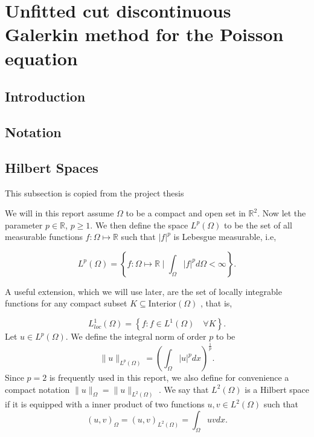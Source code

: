 
\newpage
\section{Unfitted cut discontinuous Galerkin method for the Poisson equation}%
\label{sec:elliptic}

\subsection{Introduction}%
\label{sub:introduction}


\subsection{Notation}%
\label{sub:notation}

\subsection{Hilbert Spaces}%

\label{ssub:hilbert_spaces}
\begin{tcolorbox}
    This subsection is copied from the project thesis
\end{tcolorbox}

We will in this report assume $\Omega $ to be a compact and open set in $\mathbb{R} ^{2}$. Now let the parameter $p \in \mathbb{R} $, $p\ge 1$. We then define the space $L^{p}\left( \Omega  \right) $ to be the set of all measurable functions $f: \Omega  \mapsto \mathbb{R} $ such that
$\left\lvert f \right\rvert ^{p}$ is Lebesgue measurable, i.e,

\begin{equation*}
    L^{p}\left( \Omega  \right) = \left\{ f: \Omega \mapsto \mathbb{R}  \mid \int_{\Omega }^{} \left\lvert f \right\rvert ^{p} d \Omega  < \infty  \right\}
.\end{equation*}

A useful extension, which we will use later, are the set of locally integrable functions for any compact subset $K \subseteq \text{Interior}\left( \Omega  \right) $ \cite{brenner07math}, that is,

\begin{equation*}
    L_{loc}^{1}\left( \Omega  \right)  = \left\{ f: f \in L^{1}\left( \Omega  \right)  \quad \forall K  \right\}.
\end{equation*}
Let $u \in L^{p}\left( \Omega  \right) $. We define the integral norm of order $p$ to be \[
\| u \|_{ L^{p}\left( \Omega  \right)  }^{  }  = \left( \int_{\Omega }^{} \left\lvert u \right\rvert ^{p} dx  \right) ^{\frac{1}{p}}.
\]
Since $p=2$ is frequently used in this report, we also define for convenience a compact notation $\| u \|_{ \Omega  }^{  }  = \| u \|_{ L^{2}\left( \Omega  \right)  }^{  } $ .  We say that $L^{2}\left( \Omega  \right) $ is a Hilbert space if it is equipped with a inner
product of two functions $u,v \in L^{2}\left( \Omega  \right) $ such that
\[
\left( u,v \right) _{\Omega } = \left( u,v \right) _{L^2\left( \Omega  \right) } = \int_{\Omega }^{} u  v dx.
\]

